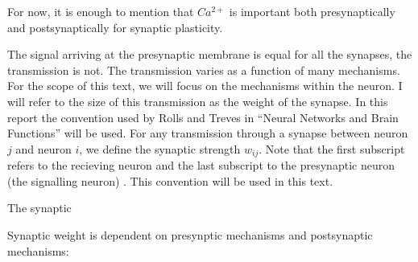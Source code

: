 













For now, it is enough to mention that  $Ca^{2+}$ is important both presynaptically and postsynaptically for synaptic plasticity.












The signal arriving at the presynaptic membrane is equal for all the synapses, the transmission is not. 
The transmission varies as a function of many mechanisms. %
For the scope of this text, we will focus on the mechanisms within the neuron. 
I will refer to the size of this transmission as the weight of the synapse. 
In this report the convention used by Rolls and Treves in ``Neural Networks and Brain Functions'' will be used. 
For any transmission through a synapse between neuron $j$ and neuron $i$, we define the synaptic strength $w_{ij}$. 
Note that the first subscript refers to the recieving neuron and the last subscript to the presynaptic neuron (the signalling neuron) \cite{TrevesNeuralNetworks}.
This convention will be used in this text. 

The synaptic 






Synaptic weight is dependent on presynptic mechanisms and postsynaptic mechanisms:


